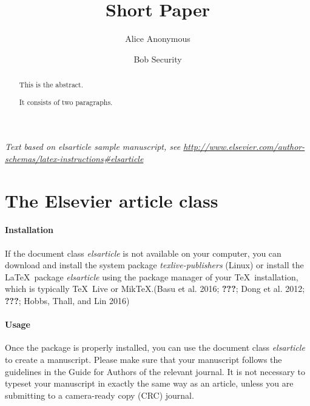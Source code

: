 \documentclass[]{elsarticle} %
\begin{document}
\begin{frontmatter}

  \title{Short Paper}
    \author[Some Institute of Technology]{Alice Anonymous}
    \author[Another University]{Bob Security}
  
      \address[Some Institute of Technology]{Department, Street, City, State, Zip}
    \address[Another University]{Department, Street, City, State, Zip}
  
  \begin{abstract}
  This is the abstract.
  
  It consists of two paragraphs.
  \end{abstract}
  
 \end{frontmatter}

\emph{Text based on elsarticle sample manuscript, see
\url{http://www.elsevier.com/author-schemas/latex-instructions\#elsarticle}}

\section{The Elsevier article class}\label{the-elsevier-article-class}

\paragraph{Installation}\label{installation}

If the document class \emph{elsarticle} is not available on your
computer, you can download and install the system package
\emph{texlive-publishers} (Linux) or install the LaTeX~package
\emph{elsarticle} using the package manager of your TeX~installation,
which is typically TeX~Live or MikTeX.(Basu et al. 2016; {\textbf{???}};
Dong et al. 2012; {\textbf{???}}; Hobbs, Thall, and Lin 2016)

\paragraph{Usage}\label{usage}

Once the package is properly installed, you can use the document class
\emph{elsarticle} to create a manuscript. Please make sure that your
manuscript follows the guidelines in the Guide for Authors of the
relevant journal. It is not necessary to typeset your manuscript in
exactly the same way as an article, unless you are submitting to a
camera-ready copy (CRC) journal.
\end{document}

